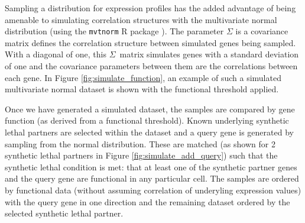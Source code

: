 Sampling a distribution for expression profiles has the added advantage of being amenable to simulating correlation structures with the multivariate normal distribution (using the \texttt{mvtnorm} R package \citep{Genz2009, mvtnorm}). The parameter $\Sigma$ is a covariance matrix defines the correlation structure between simulated genes being sampled. With a diagonal of one, this $\Sigma$\ matrix simulates genes with a standard deviation of one and the covariance parameters between them are the correlations between each gene. In Figure \ref{fig:simulate_function}, an example of such a simulated multivariate normal dataset is shown with the functional threshold applied.

Once we have generated a simulated dataset, the samples are compared by gene function (as derived from a functional threshold). Known underlying synthetic lethal partners are selected within the dataset and a query gene is generated by sampling from the normal distribution. These are matched (as shown for 2 synthetic lethal partners in Figure \ref{fig:simulate_add_query}) such that the synthetic lethal condition is met: that at least one of the synthetic partner genes and the query gene are functional in any particular cell. The samples are ordered by functional data (without assuming correlation of underyling expression values) with the query gene in one direction and the remaining dataset ordered by the selected synthetic lethal partner.


